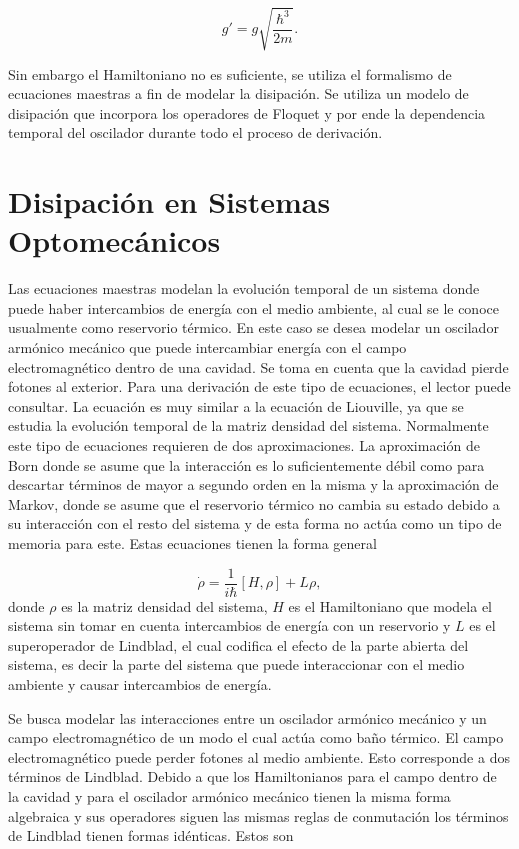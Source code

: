 \documentclass[10pt,a4paper]{report}
\begin{document}
\begin{equation}
g'=g\sqrt{\frac{\hbar^3}{2m}}.
\end{equation}

Sin embargo el Hamiltoniano no es suficiente, se utiliza el formalismo de ecuaciones maestras a fin de modelar la disipación. Se utiliza un modelo de disipación que incorpora los operadores de Floquet y por ende la dependencia temporal del oscilador durante todo el proceso de derivación. 

\section{Disipación en Sistemas Optomecánicos}

Las ecuaciones maestras modelan la evolución temporal de un sistema donde puede haber intercambios de energía con el medio ambiente, al cual se le conoce usualmente como reservorio térmico. En este caso se desea modelar un oscilador armónico mecánico que puede intercambiar energía con el campo electromagnético dentro de una cavidad. Se toma en cuenta que la cavidad pierde fotones al exterior. Para una derivación de este tipo de ecuaciones, el lector puede consultar\cite{ZollerQN}. La ecuación es muy similar a la ecuación de Liouville, ya que se estudia la evolución temporal de la matriz densidad del sistema. Normalmente este tipo de ecuaciones requieren de dos aproximaciones. La aproximación de Born donde se asume que la interacción es lo suficientemente débil como para descartar términos de mayor a segundo orden en la misma y la aproximación de Markov, donde se asume que el reservorio térmico no cambia su estado debido a su interacción con el resto del sistema y de esta forma no actúa como un tipo de memoria para este\cite{CarmichaelFL}. Estas ecuaciones tienen la forma general

\begin{equation}\label{MasterEq}
\dot{\rho} = \frac{1}{i\hbar}[H,\rho] + L\rho,
\end{equation} donde $\rho$ es la matriz densidad del sistema, $H$ es el Hamiltoniano que modela el sistema sin tomar en cuenta intercambios de energía con un reservorio y $L$ es el superoperador de Lindblad, el cual codifica el efecto de la parte abierta del sistema, es decir la parte del sistema que puede interaccionar con el medio ambiente y causar intercambios de energía.

Se busca modelar las interacciones entre un oscilador armónico mecánico y un campo electromagnético de un modo el cual actúa como baño térmico. El campo electromagnético puede perder fotones al medio ambiente. Esto corresponde a dos términos de Lindblad. Debido a que los Hamiltonianos para el campo dentro de la cavidad y para el oscilador armónico mecánico tienen la misma forma algebraica y sus operadores siguen las mismas reglas de conmutación los términos de Lindblad tienen formas idénticas. Estos son \cite{EnglertDB}
\end{document}
